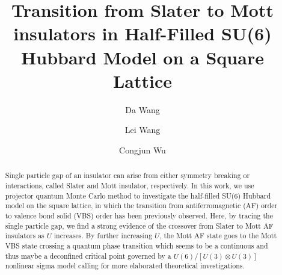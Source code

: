 \documentclass[twocolumn,superscriptaddress]{revtex4-1}
\begin{document}
\title{Transition from Slater to Mott insulators in Half-Filled SU(6) Hubbard Model on a Square Lattice}
\author{Da Wang} %
\author{Lei Wang} %
\author{Congjun Wu} %
\begin{abstract}
    Single particle gap of an insulator can arise from either symmetry breaking or interactions, called Slater and Mott insulator, respectively. In this work, we use projector quantum Monte Carlo method to investigate the half-filled SU(6) Hubbard model on the square lattice, in which the transition from antiferromagnetic (AF) order to valence bond solid (VBS) order has been previously observed. Here, by tracing the single particle gap, we find a strong evidence of the crossover from Slater to Mott AF insulators as $U$ increases. By further increasing $U$, the Mott AF state goes to the Mott VBS state crossing a quantum phase transition which seems to be a continuous and thus maybe a deconfined critical point governed by a $U(6)/[U(3)\otimes U(3)]$ nonlinear sigma model calling for more elaborated theoretical investigations. 
\end{abstract}
\maketitle
\end{document}
